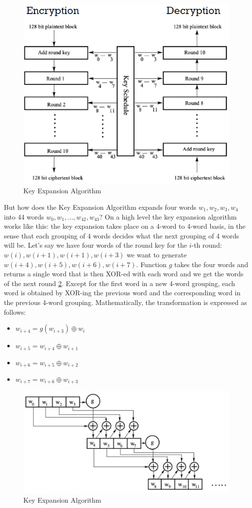 \begin{figure}
	\centering
	\includegraphics[width=0.7\linewidth]{Images/Chapter3/Key_Expansion_Algorithm2}
	\caption{Key Expansion Algorithm}
	\label{fig:Key_Expansion_Algorithm2}
\end{figure}


But how does the Key Expansion Algorithm expands four words $w_1,w_2,w_3,w_4$ into 44 words $w_0,w_1,\ldots,w_{42},w_{43}$? On a high level the key expansion algorithm works like this: the key expansion takes place on a 4-word to 4-word basis, in the sense that each grouping of 4 words decides what the next grouping of 4 words will be. Let's say we have four words of the round key for the $i$-th round: $w(i),w(i+1),w(i+1),w(i+3)$ we want to generate $w(i+4),w(i+5),w(i+6),w(i+7)$.
Function $g$ takes the four words and returns a single word that is then XOR-ed with each word and we get the words of the next round \ref{fig:Key_Expansion_Algorithm3}.
Except for the first word in a new 4-word grouping, each word is obtained by XOR-ing the previous word and the corresponding word in the previous 4-word grouping.
Mathematically, the transformation is expressed as follows:

\begin{itemize}
	\item $w_{i+4} = g(w_{i+3}) \oplus w_i$
	\item $w_{i+5} = w_{i+4} \oplus w_{i+1}$
	\item $w_{i+6} = w_{i+5} \oplus w_{i+2}$
	\item $w_{i+7} = w_{i+6} \oplus w_{i+3}$
\end{itemize}

\begin{figure}
	\centering
	\includegraphics[width=0.7\linewidth]{Images/Chapter3/Key_Expansion_Algorithm3}
	\caption{Key Expansion Algorithm}
	\label{fig:Key_Expansion_Algorithm3}
\end{figure}



